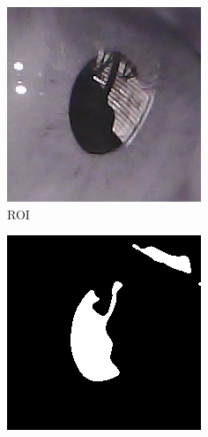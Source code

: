 \begin{figure}[h]
    \centering
    \begin{subfigure}{0.3\textwidth}
        \centering
        \includegraphics[width=0.9\linewidth]{plots/results/roi_text_resutls.png}
        \caption{ROI}
    \end{subfigure}%
    \hfill
    \begin{subfigure}{0.3\textwidth}
        \centering
        \includegraphics[width=0.9\linewidth]{plots/results/roi_binary_ellipse.png}

\end{subfigure}
\end{figure}
